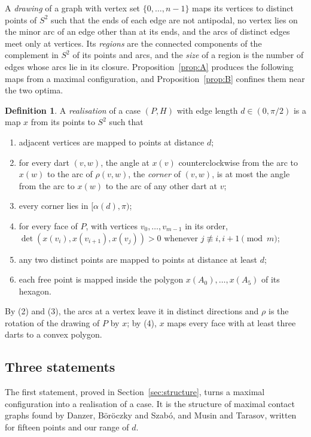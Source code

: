 \documentclass[12pt]{amsart}
\theoremstyle{definition}
\newtheorem{definition}[theorem]{Definition}
\theoremstyle{plain}
\theoremstyle{definition}
\newcommand{\Sph}{S^2}
\newcommand{\leanmap}[1]{\ignorespaces}
\begin{document}
A \emph{drawing} of a graph with vertex set $\{0,\dots,n-1\}$ maps its vertices to distinct points of $\Sph$ such that the ends of each edge are not antipodal, no vertex lies on the minor arc of an edge other than at its ends, and the arcs of distinct edges meet only at vertices. Its \emph{regions} are the connected components of the complement in $\Sph$ of its points and arcs, and the \emph{size} of a region is the number of edges whose arcs lie in its closure. Proposition~\ref{prop:A} produces the following maps from a maximal configuration, and Proposition~\ref{prop:B} confines them near the two optima.

\begin{definition}\label{def:real}\leanmap{Tammes15.Realisation, Tammes15.IsAngular, Tammes15.StrictSupportFace, Tammes15.ocorner}
A \emph{realisation} of a case $(P,H)$ with edge length $d\in(0,\pi/2)$ is a map $x$ from its points to $\Sph$ such that
\begin{enumerate}
\item adjacent vertices are mapped to points at distance $d$;
\item for every dart $(v,w)$, the angle at $x(v)$ counterclockwise from the arc to $x(w)$ to the arc of $\rho(v,w)$, the \emph{corner} of $(v,w)$, is at most the angle from the arc to $x(w)$ to the arc of any other dart at $v$;
\item every corner lies in $[\alpha(d),\pi)$;
\item for every face of $P$, with vertices $v_0,\dots,v_{m-1}$ in its order, $\det(x(v_i),x(v_{i+1}),x(v_j))>0$ whenever $j\not\equiv i,i+1\pmod m$;
\item any two distinct points are mapped to points at distance at least $d$;
\item each free point is mapped inside the polygon $x(A_0),\dots,x(A_5)$ of its hexagon.
\end{enumerate}
\end{definition}

By (2) and (3), the arcs at a vertex leave it in distinct directions and $\rho$ is the rotation of the drawing of $P$ by $x$; by (4), $x$ maps every face with at least three darts to a convex polygon.

\subsection{Three statements}\label{sec:three}
The first statement, proved in Section~\ref{sec:structure}, turns a maximal configuration into a realisation of a case. It is the structure of maximal contact graphs found by Danzer, B\"or\"oczky and Szab\'o, and Musin and Tarasov, written for fifteen points and our range of $d$.
\end{document}
